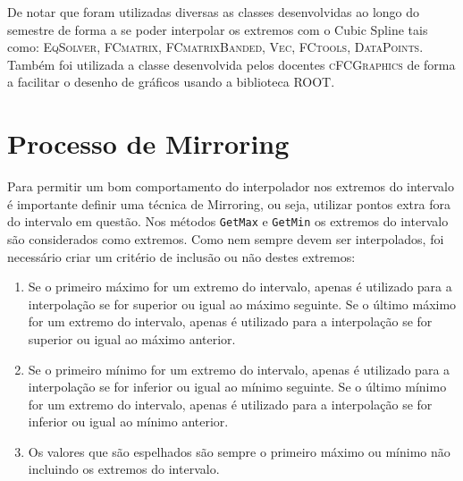 \documentclass[letterpaper]{article}
\begin{document}
\begin{multicols}{2}
\begin{enumerate}
\begin{enumerate}[label = \textbf{(\arabic*)} ]
        \end{enumerate}
        
    De notar que foram utilizadas diversas as classes desenvolvidas ao longo do semestre de forma a se poder interpolar os extremos com o Cubic Spline tais como: \textsc{EqSolver}, \textsc{FCmatrix}, \textsc{FCmatrixBanded}, \textsc{Vec}, \textsc{FCtools}, \textsc{DataPoints}. Também foi utilizada a classe desenvolvida pelos docentes \textsc{cFCGraphics} de forma a facilitar o desenho de gráficos usando a biblioteca \textsc{ROOT}.

\end{enumerate}

\section{Processo de Mirroring}

Para permitir um bom comportamento do interpolador nos extremos do intervalo é importante definir uma técnica de Mirroring, ou seja, utilizar pontos extra fora do intervalo em questão. Nos métodos \texttt{GetMax} e \texttt{GetMin} os extremos do intervalo são considerados como extremos. Como nem sempre devem ser interpolados, foi necessário criar um critério de inclusão ou não destes extremos:

\begin{enumerate}[label = \textbf{(\arabic*)} ]

\item Se o primeiro máximo for um extremo do intervalo, apenas é utilizado para a interpolação se for superior ou igual ao máximo seguinte. Se o último máximo for um extremo do intervalo, apenas é utilizado para a interpolação se for superior ou igual ao máximo anterior.

\item Se o primeiro mínimo for um extremo do intervalo, apenas é utilizado para a interpolação se for inferior ou igual ao mínimo seguinte. Se o último mínimo for um extremo do intervalo, apenas é utilizado para a interpolação se for inferior ou igual ao mínimo anterior.

\item Os valores que são espelhados são sempre o primeiro máximo ou mínimo não incluindo os extremos do intervalo.

\end{enumerate}

\end{multicols}
\end{document}
